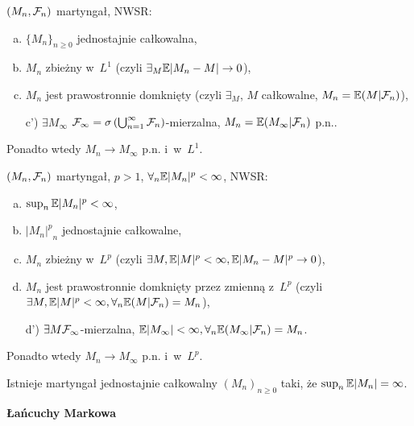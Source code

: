 



	\begin{theorem}[zbieżność w~$L^1$]
		$(M_n, \mathcal{F}_n)$ martyngał, NWSR:
		\begin{enumerate}[a)]
			\item $\{ M_n \}_{n \geq 0}$ jednostajnie całkowalna,
			\item $M_n$ zbieżny w~$L^1$
			(czyli $\exists_M \mathbb{E} |M_n - M| \to 0$),
			\item $M_n$ jest prawostronnie domknięty
			(czyli $\exists_M$, $M$ całkowalne, 
			$M_n = \mathbb{E}(M | \mathcal{F}_n)$),
			\item[c')] $\exists {M_\infty}$ 
			$\mathcal{F}_\infty=\sigma\left( \bigcup_{n=1}^\infty \mathcal{F}_n \right)
			$-mierzalna, 
			$M_n = \mathbb{E} (M_\infty | \mathcal{F}_n)$ p.n..
		\end{enumerate}
		
		Ponadto wtedy $M_n \to M_\infty$ p.n. i~w~$L^1$.

	\end{theorem}
	
	\begin{theorem}[zbieżność w~$L^p$]
		$(M_n, \mathcal{F}_n)$ martyngał, $p>1$, $\forall_n \mathbb{E} |M_n|^p < \infty$,
		NWSR:
		\begin{enumerate}[a)]
			\item $\sup_n \mathbb{E} |M_n|^p < \infty$,
			\item ${|M_n|^p}_n$ jednostajnie całkowalne,
			\item $M_n$ zbieżny w~$L^p$ 
			(czyli $\exists M, \mathbb{E} |M|^p < \infty, \mathbb{E} |M_n - M|^p \to 0$),
			\item $M_n$ jest prawostronnie domknięty
			przez zmienną z~$L^p$
			(czyli $\exists M, \mathbb{E} |M|^p < \infty, 
			\forall_n \mathbb{E}(M | \mathcal{F}_n) = M_n$),
			\item[d')] $\exists M \mathcal{F}_\infty$-mierzalna, 
			$\mathbb{E} |M_\infty| < \infty,
			\forall_n \mathbb{E} (M_\infty | \mathcal{F}_n) = M_n$.

		\end{enumerate}
		
		Ponadto wtedy $M_n \to M_\infty$ p.n. i~w~$L^p$.

	\end{theorem}
	
	\begin{remark}
		Istnieje martyngał jednostajnie całkowalny $(M_n)_{n \geq 0}$ 
		taki, że $\sup_n \mathbb{E} |M_n| = \infty$.
	\end{remark}
	\pagebreak
	{\bf Łańcuchy Markowa}
	
